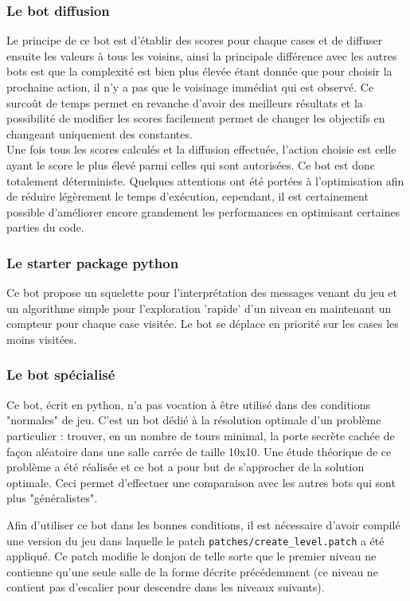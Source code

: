 \documentclass[a4paper,12pt]{article}
\begin{document}
\subsubsection{Le bot diffusion}
Le principe de ce bot est d'établir des scores pour chaque cases et de diffuser
ensuite les valeurs à tous les voisins, ainsi la principale différence avec les
autres bots est que la complexité est bien plus élevée étant donnée que pour
choisir la prochaine action, il n'y a pas que le voisinage immédiat qui est
observé. Ce surcoût de temps permet en revanche d'avoir des meilleurs résultats
et la possibilité de modifier les scores facilement permet de changer les
objectifs en changeant uniquement des constantes.
\\
Une fois tous les scores calculés et la diffusion effectuée, l'action choisie
est celle ayant le score le plus élevé parmi celles qui sont autorisées. Ce bot
est donc totalement déterministe. Quelques attentions ont été portées à
l'optimisation afin de réduire légèrement le temps d'exécution, cependant, il
est certainement possible d'améliorer encore grandement les performances en
optimisant certaines parties du code.

\subsubsection{Le starter package python}

Ce bot propose un squelette pour l'interprétation des messages venant du jeu
et un algorithme simple pour l'exploration 'rapide' d'un niveau en maintenant
un compteur pour chaque case visitée. Le bot se déplace en priorité sur les
cases les moins visitées.

\subsubsection{Le bot spécialisé}

Ce bot, écrit en python, n'a pas vocation à être utilisé dans des conditions
"normales" de jeu. C'est un bot dédié à la résolution optimale d'un problème
particulier : trouver, en un nombre de tours minimal, la porte secrète cachée
de façon aléatoire dans une salle carrée de taille 10x10. Une étude théorique
de ce problème a été réalisée et ce bot a pour but de s'approcher de la
solution optimale. Ceci permet d'effectuer une comparaison avec les autres
bots qui sont plus "généralistes".

Afin d'utiliser ce bot dans les bonnes conditions, il est nécessaire d'avoir
compilé une version du jeu dans laquelle le patch
{\verb|patches/create_level.patch|} a été appliqué. Ce patch modifie le donjon
de telle sorte que le premier niveau ne contienne qu'une seule salle de la
forme décrite précédemment (ce niveau ne contient pas d'escalier pour
descendre dans les niveaux suivants).
\end{document}
